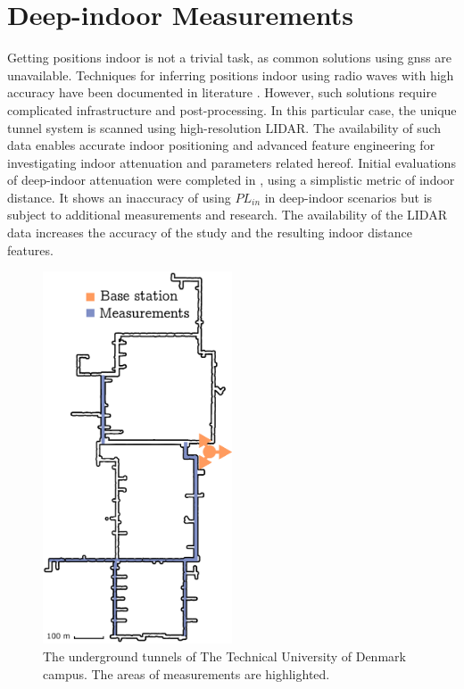 \section{Deep-indoor Measurements}
Getting positions indoor is not a trivial task, as common solutions using \gls{gnss} are unavailable. Techniques for inferring positions indoor using radio waves with high accuracy have been documented in literature \cite{Nuaimi2011}. However, such solutions require complicated infrastructure and post-processing. In this particular case, the unique tunnel system is scanned using high-resolution LIDAR. The availability of such data enables accurate indoor positioning and advanced feature engineering for investigating indoor attenuation and parameters related hereof.  Initial evaluations of deep-indoor attenuation were completed in \cite{Malarski2019InvestigationAttenuation}, using a simplistic metric of indoor distance. It shows an inaccuracy of using $PL_{in}$ in deep-indoor scenarios but is subject to additional measurements and research. The availability of the LIDAR data increases the accuracy of the study and the resulting indoor distance features. 
\begin{figure}[thbp]
    \centering
    \includegraphics[width=0.5\textwidth]{chapters/part_pathloss/figures/outdoor_to_indoor/Complete_tunnel_system.eps}
    \caption{The underground tunnels of The Technical University of Denmark campus. The areas of measurements are highlighted.}
    \label{fig:underground_tunnel_system}
\end{figure}

